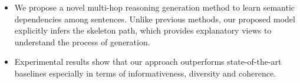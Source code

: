 \documentclass[letterpaper]{article} %
\begin{document}
\begin{itemize}
\item We propose a novel multi-hop reasoning generation method to learn semantic dependencies among sentences. Unlike previous methods, our proposed model explicitly infers the skeleton path, which provides explanatory views to understand the process of generation. %



\item Experimental results show that our approach outperforms state-of-the-art baselines especially in terms of informativeness, diversity and coherence.





\end{itemize}



\end{document}
